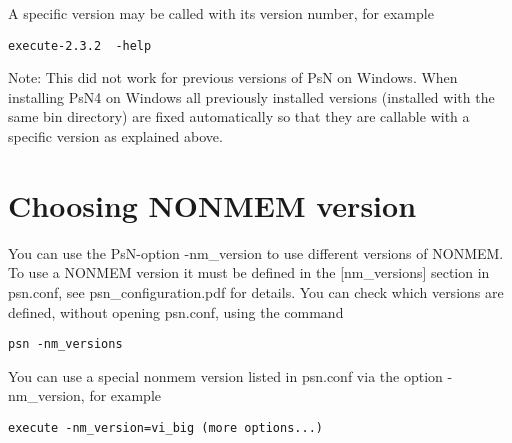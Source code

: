 A specific version may be called with its version number, for example

\begin{verbatim}
execute-2.3.2  -help 
\end{verbatim}

Note: This did not work for previous versions of PsN on Windows. When installing PsN4 on Windows all previously installed versions (installed with the same bin directory) are fixed automatically so that they are callable with a specific version as explained above.

\section{Choosing NONMEM version}
You can use the PsN-option -nm\_version to use different versions of NONMEM. To use a NONMEM version it must be defined in the [nm\_versions] section in psn.conf, see psn\_configuration.pdf for details. You can check which versions are defined, without opening psn.conf, using the command

\begin{verbatim}
psn -nm_versions
\end{verbatim}

You can use a special nonmem version listed in psn.conf via the option -nm\_version, for example

\begin{verbatim}
execute -nm_version=vi_big (more options...)
\end{verbatim}

